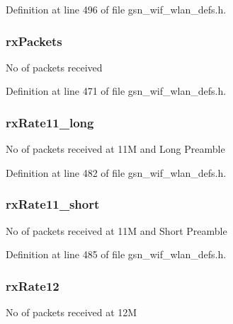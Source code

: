 Definition at line 496 of file gsn\_\-wif\_\-wlan\_\-defs.h.

\hypertarget{a00419_afcd1c82d474f2f73a78e52d4e94476df}{
\subsubsection[{rxPackets}]{ {\bf rxPackets}}}
\label{a00419_afcd1c82d474f2f73a78e52d4e94476df}
No of packets received 

Definition at line 471 of file gsn\_\-wif\_\-wlan\_\-defs.h.

\hypertarget{a00419_aaca42bfc086b7050ceb653bdc72eb65a}{
\subsubsection[{rxRate11\_\-long}]{ {\bf rxRate11\_\-long}}}
\label{a00419_aaca42bfc086b7050ceb653bdc72eb65a}
No of packets received at 11M and Long Preamble 

Definition at line 482 of file gsn\_\-wif\_\-wlan\_\-defs.h.

\hypertarget{a00419_a0fb6f762bc2dc057b652e525d740627c}{
\subsubsection[{rxRate11\_\-short}]{ {\bf rxRate11\_\-short}}}
\label{a00419_a0fb6f762bc2dc057b652e525d740627c}
No of packets received at 11M and Short Preamble 

Definition at line 485 of file gsn\_\-wif\_\-wlan\_\-defs.h.

\hypertarget{a00419_a9bbaff40dace9b5651e89b06c6f52ced}{
\subsubsection[{rxRate12}]{ {\bf rxRate12}}}
\label{a00419_a9bbaff40dace9b5651e89b06c6f52ced}
No of packets received at 12M 


